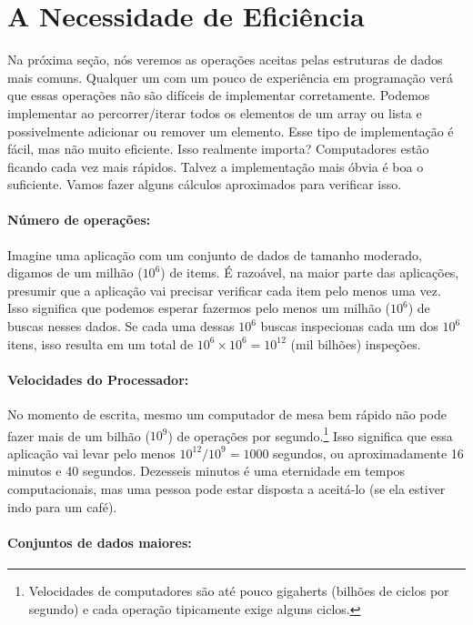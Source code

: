 \section{A Necessidade de Eficiência}
Na próxima seção, nós veremos as operações aceitas pelas estruturas de dados mais comuns.
Qualquer um com um pouco de experiência em programação verá que essas operações não são difíceis de implementar corretamente.
Podemos implementar ao percorrer/iterar todos os elementos de um array ou lista e possivelmente adicionar ou remover um elemento.
Esse tipo de implementação é fácil, mas não muito eficiente.
Isso realmente importa? Computadores estão ficando cada vez mais rápidos.
Talvez a implementação mais óbvia é boa o suficiente.
Vamos fazer alguns cálculos aproximados para verificar isso.

\paragraph{Número de operações:}
Imagine uma aplicação com um conjunto de dados de tamanho moderado, digamos de um milhão ($10^6$) de items. 
É razoável, na maior parte das aplicações, presumir que a aplicação vai precisar verificar cada item pelo menos uma vez. Isso significa que podemos esperar fazermos pelo menos um milhão ($10^6$) de buscas nesses dados. Se cada uma dessas $10^6$ buscas inspecionas cada um dos $10^6$ itens, isso resulta em um total de $10^6\times 10^6=10^{12}$ (mil bilhões) inspeções.

\paragraph{Velocidades do Processador:} 

No momento de escrita, mesmo um computador de mesa bem rápido não pode fazer mais de um bilhão ($10^9$) de operações por segundo.\footnote{Velocidades de computadores são até pouco gigaherts (bilhões de ciclos por segundo) e cada operação tipicamente exige alguns ciclos.}
Isso significa que essa aplicação vai levar pelo menos $10^{12}/10^9 = 1000$
segundos, ou aproximadamente 16 minutos e 40 segundos. Dezesseis minutos é uma eternidade em tempos computacionais, mas uma pessoa pode estar disposta a aceitá-lo (se ela estiver indo para um café).

\paragraph{Conjuntos de dados maiores:} 

